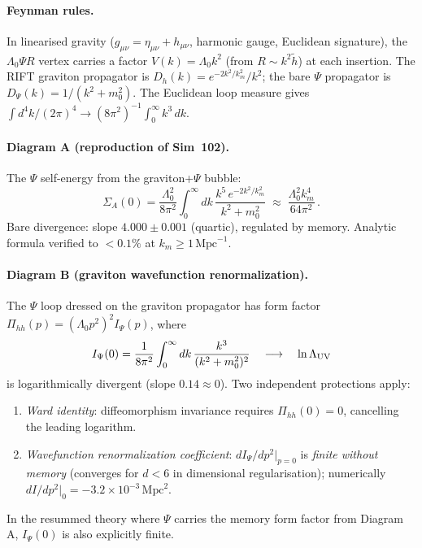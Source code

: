 \documentclass[12pt,a4paper]{article}
\begin{document}
\paragraph{Feynman rules.}
In linearised gravity ($g_{\mu\nu}=\eta_{\mu\nu}+h_{\mu\nu}$, harmonic gauge,
Euclidean signature), the $\Lambda_0\Psi R$ vertex carries a factor
$V(k) = \Lambda_0 k^2$ (from $R \sim k^2 \tilde{h}$) at each insertion.
The RIFT graviton propagator is $D_h(k)=e^{-2k^2/k_m^2}/k^2$;
the bare $\Psi$ propagator is $D_\Psi(k)=1/(k^2+m_0^2)$.
The Euclidean loop measure gives $\int d^4k/(2\pi)^4 \to (8\pi^2)^{-1}\int_0^\infty k^3\,dk$.

\paragraph{Diagram A (reproduction of Sim~102).}
The $\Psi$ self-energy from the graviton+$\Psi$ bubble:
\begin{equation}
\Sigma_A(0) = \frac{\Lambda_0^2}{8\pi^2}\int_0^\infty dk\,
  \frac{k^5\,e^{-2k^2/k_m^2}}{k^2+m_0^2}
\;\approx\; \frac{\Lambda_0^2 k_m^4}{64\pi^2}\,.
\end{equation}
Bare divergence: slope $4.000\pm0.001$ (quartic), regulated by memory.
Analytic formula verified to $<0.1\%$ at $k_m \geq 1\,\mathrm{Mpc}^{-1}$.

\paragraph{Diagram B (graviton wavefunction renormalization).}
The $\Psi$ loop dressed on the graviton propagator has form factor
$\Pi_{hh}(p) = (\Lambda_0 p^2)^2 I_\Psi(p)$, where
\begin{equation}
I_\Psi(0) = \frac{1}{8\pi^2}\int_0^\infty dk\,\frac{k^3}{(k^2+m_0^2)^2}
\quad\longrightarrow\quad \ln\Lambda_{\rm UV}
\end{equation}
is logarithmically divergent (slope $0.14 \approx 0$).
Two independent protections apply:
\begin{enumerate}
\item \emph{Ward identity}: diffeomorphism invariance requires $\Pi_{hh}(0)=0$,
  cancelling the leading logarithm.
\item \emph{Wavefunction renormalization coefficient}: $dI_\Psi/dp^2|_{p=0}$
  is \emph{finite without memory} (converges for $d<6$ in dimensional
  regularisation); numerically $dI/dp^2|_0 = -3.2\times10^{-3}\,\mathrm{Mpc}^{2}$.
\end{enumerate}
In the resummed theory where $\Psi$ carries the memory form factor from
Diagram A, $I_\Psi(0)$ is also explicitly finite.
\end{document}

